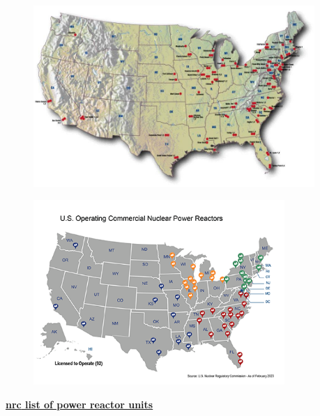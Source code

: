 \documentclass[aspectratio=1610,pdftex,dvipsnames,compress,xcolor={dvipsnames}]{beamer}
\newcommand{\acs}{\acrshort} %
\begin{document}
\addtocounter{framenumber}{-1} 
\begin{frame}{}
    \begin{figure}
        \centering
        \includegraphics[width=0.95\textwidth]{nuclear.reactor.sites.jpg}
    \end{figure}
\end{frame}


\begin{frame}{}
    \begin{figure}
        \centering
        \includegraphics[width=0.85\textwidth]{power-reactors-operating.png}
    \end{figure}
\end{frame}


\begin{frame}[plain]{}
    \centering\LARGE\textbf{\href{https://www.nrc.gov/reactors/operating/list-power-reactor-units.html}{\acs{nrc} list of power reactor units}}
\end{frame}
\end{document}
